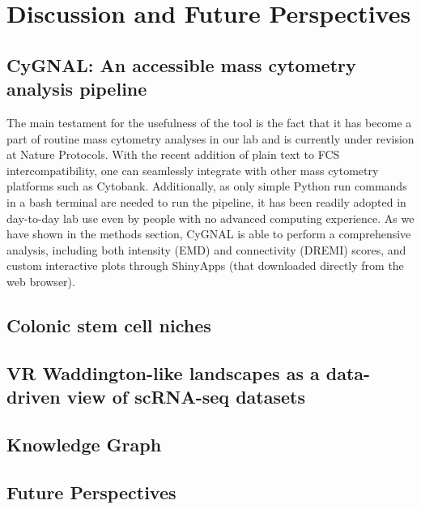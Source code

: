 \chapter{Discussion and Future Perspectives}
\label{07disc}

\section{CyGNAL: An accessible mass cytometry analysis pipeline}

The main testament for the usefulness of the tool is the fact that it has become a part of routine mass cytometry analyses in our lab and is currently under revision at Nature Protocols. With the recent addition of plain text to FCS intercompatibility, one can seamlessly integrate with other mass cytometry platforms such as Cytobank. Additionally, as only simple Python run commands in a bash terminal are needed to run the pipeline, it has been readily adopted in day-to-day lab use even by people with no advanced computing experience. As we have shown in the methods section, CyGNAL is able to perform a comprehensive analysis, including both intensity (EMD) and connectivity (DREMI) scores, and custom interactive plots through ShinyApps (that downloaded directly from the web browser). 

\section{Colonic stem cell niches}

\section{VR Waddington-like landscapes as a data-driven view of scRNA-seq datasets}

\section{Knowledge Graph}

\section{Future Perspectives}
